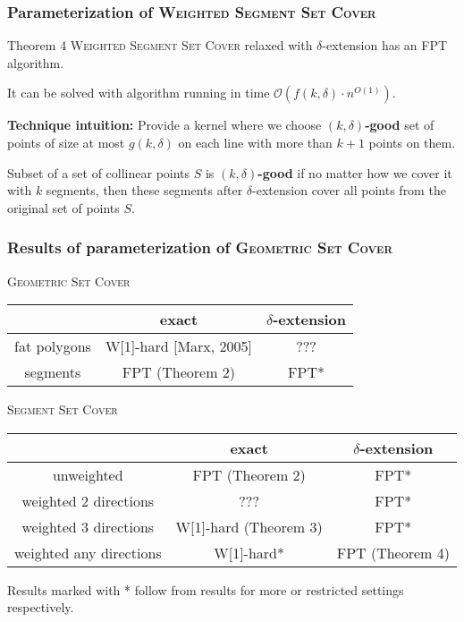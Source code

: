 \documentclass{beamer}
\begin{document}
\begin{frame}
\frametitle{Parameterization of \textsc{Weighted Segment Set Cover}}
\begin{block}{Theorem 4}
	\textsc{Weighted Segment Set Cover} relaxed
	with $\delta$-extension has an FPT algorithm.
	
	It can be solved with algorithm running in time $\mathcal{O}(f(k,\delta) \cdot n^{O(1)})$.
\end{block}

\textbf{Technique intuition:} Provide a kernel where we choose
\textbf{$(k, \delta)$-good} set of points of size at most $g(k, \delta)$
on each line with more than $k+1$ points on them.

Subset of a set of collinear points $S$
is \textbf{$(k, \delta)$-good}
if no matter how we cover it with $k$
segments, then these segments after $\delta$-extension
cover all points from the original set of points $S$.
\end{frame}

\begin{frame}
\frametitle{Results of parameterization of \textsc{Geometric Set Cover}}


\textsc{Geometric Set Cover}
\begin{tabular}{|c|c|c|}
\hline
           & exact & $\delta$-extension \\
\hline
fat polygons & W[1]-hard [Marx, 2005] & ??? \\
\hline
segments &  \textcolor{olivegreen}{FPT (Theorem 2)} & \textcolor{olivegreen}{FPT*} \\
\hline
\end{tabular}

\bigskip

\textsc{Segment Set Cover}
\begin{tabular}{|c|c|c|}
\hline
           & exact & $\delta$-extension \\
\hline
unweighted & \textcolor{olivegreen}{FPT (Theorem 2)} & \textcolor{olivegreen}{FPT*} \\
\hline
weighted 2 directions & ??? & \textcolor{olivegreen}{FPT*} \\
\hline
weighted 3 directions & \textcolor{olivegreen}{W[1]-hard (Theorem 3)} &  \textcolor{olivegreen}{FPT*}\\
\hline
weighted any directions & \textcolor{olivegreen}{W[1]-hard*} &  \textcolor{olivegreen}{FPT (Theorem 4)}\\
\hline
\end{tabular}


\bigskip
Results marked with * follow from results for more or restricted settings respectively.

\end{frame}
\end{document}
